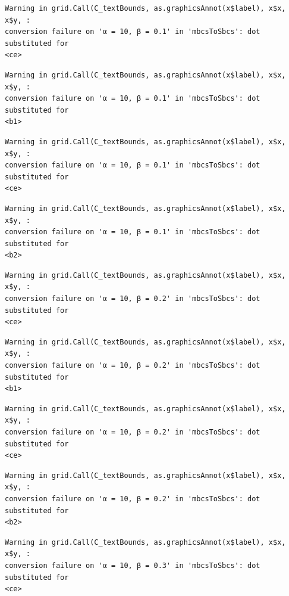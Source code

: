\documentclass[
  spanish,
  a4paper,
]{scrreport}
\theoremstyle{plain}
\theoremstyle{definition}
\theoremstyle{definition}
\theoremstyle{remark}
\begin{document}
\begin{verbatim}
Warning in grid.Call(C_textBounds, as.graphicsAnnot(x$label), x$x, x$y, :
conversion failure on 'α = 10, β = 0.1' in 'mbcsToSbcs': dot substituted for
<ce>
\end{verbatim}

\begin{verbatim}
Warning in grid.Call(C_textBounds, as.graphicsAnnot(x$label), x$x, x$y, :
conversion failure on 'α = 10, β = 0.1' in 'mbcsToSbcs': dot substituted for
<b1>
\end{verbatim}

\begin{verbatim}
Warning in grid.Call(C_textBounds, as.graphicsAnnot(x$label), x$x, x$y, :
conversion failure on 'α = 10, β = 0.1' in 'mbcsToSbcs': dot substituted for
<ce>
\end{verbatim}

\begin{verbatim}
Warning in grid.Call(C_textBounds, as.graphicsAnnot(x$label), x$x, x$y, :
conversion failure on 'α = 10, β = 0.1' in 'mbcsToSbcs': dot substituted for
<b2>
\end{verbatim}

\begin{verbatim}
Warning in grid.Call(C_textBounds, as.graphicsAnnot(x$label), x$x, x$y, :
conversion failure on 'α = 10, β = 0.2' in 'mbcsToSbcs': dot substituted for
<ce>
\end{verbatim}

\begin{verbatim}
Warning in grid.Call(C_textBounds, as.graphicsAnnot(x$label), x$x, x$y, :
conversion failure on 'α = 10, β = 0.2' in 'mbcsToSbcs': dot substituted for
<b1>
\end{verbatim}

\begin{verbatim}
Warning in grid.Call(C_textBounds, as.graphicsAnnot(x$label), x$x, x$y, :
conversion failure on 'α = 10, β = 0.2' in 'mbcsToSbcs': dot substituted for
<ce>
\end{verbatim}

\begin{verbatim}
Warning in grid.Call(C_textBounds, as.graphicsAnnot(x$label), x$x, x$y, :
conversion failure on 'α = 10, β = 0.2' in 'mbcsToSbcs': dot substituted for
<b2>
\end{verbatim}

\begin{verbatim}
Warning in grid.Call(C_textBounds, as.graphicsAnnot(x$label), x$x, x$y, :
conversion failure on 'α = 10, β = 0.3' in 'mbcsToSbcs': dot substituted for
<ce>
\end{verbatim}
\end{document}
